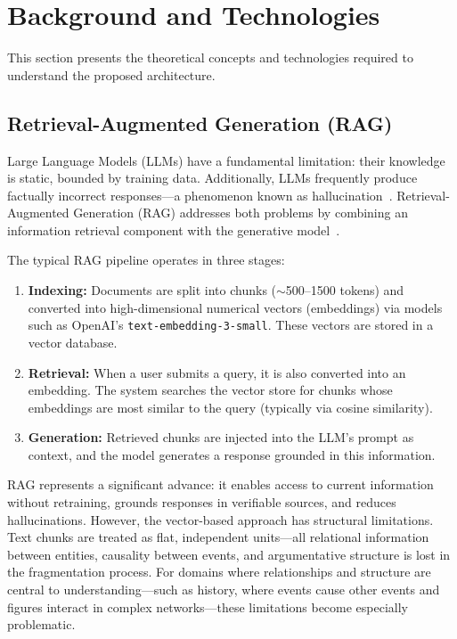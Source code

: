 \section{Background and Technologies}
\label{sec:conceitos}

This section presents the theoretical concepts and technologies required to understand the proposed architecture.

\subsection{Retrieval-Augmented Generation (RAG)}

Large Language Models (LLMs) have a fundamental limitation: their knowledge is static, bounded by training data. Additionally, LLMs frequently produce factually incorrect responses---a phenomenon known as hallucination~\cite{huang2023survey}. Retrieval-Augmented Generation (RAG) addresses both problems by combining an information retrieval component with the generative model~\cite{lewis2020rag}.

The typical RAG pipeline operates in three stages:

\begin{enumerate}
    \item \textbf{Indexing:} Documents are split into chunks ($\sim$500--1500 tokens) and converted into high-dimensional numerical vectors (embeddings) via models such as OpenAI's \texttt{text-embedding-3-small}. These vectors are stored in a vector database.
    
    \item \textbf{Retrieval:} When a user submits a query, it is also converted into an embedding. The system searches the vector store for chunks whose embeddings are most similar to the query (typically via cosine similarity).
    
    \item \textbf{Generation:} Retrieved chunks are injected into the LLM's prompt as context, and the model generates a response grounded in this information.
\end{enumerate}

RAG represents a significant advance: it enables access to current information without retraining, grounds responses in verifiable sources, and reduces hallucinations. However, the vector-based approach has structural limitations. Text chunks are treated as flat, independent units---all relational information between entities, causality between events, and argumentative structure is lost in the fragmentation process. For domains where relationships and structure are central to understanding---such as history, where events cause other events and figures interact in complex networks---these limitations become especially problematic.

